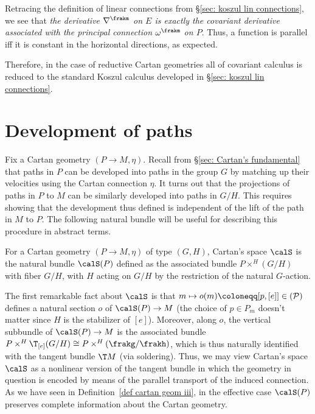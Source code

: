 Retracing the definition of linear connections from \S\ref{sec: koszul lin connections}, we see that \emph{the derivative $\nabla^\frakm$ on $E$ is exactly the covariant derivative associated with the principal connection $\omega^\frakm$ on $P$}.
Thus, a function is parallel iff it is constant in the horizontal directions, as expected. 

Therefore, in the case of reductive Cartan geometries all of covariant calculus is reduced to the standard Koszul calculus developed in \S\ref{sec: koszul lin connections}.










\section{Development of paths}

Fix a Cartan geometry $(P\to M,\eta)$. Recall from \S\ref{sec: Cartan's fundamental} that paths in $P$ can be developed into paths in the group $G$ by matching up their velocities using the Cartan connection $\eta$. It turns out that the projections of paths in $P$ to $M$ can be similarly developed into paths in $G\slash H$. This requires showing that the development thus defined is independent of the lift of the path in $M$ to $P$. The following natural bundle will be useful for describing this procedure in abstract terms.


\begin{defn}
    For a Cartan geometry $(P\to M,\eta)$ of type $(G,H)$, Cartan's space $\calS$ is the natural bundle $\calS(P)$ defined as the associated bundle $P\times^H (G\slash H)$ with fiber $G\slash H$, with $H$ acting on $G\slash H$ by the restriction of the natural $G$-action.
\end{defn}

The first remarkable fact about $\calS$ is that $m\mapsto o(m)\coloneqq [p,[e]]\in \cal(P)$ defines a natural section $o$ of $\calS(P)\to M$ (the choice of $p\in P_m$ doesn't matter since $H$ is the stabilizer of $[e]$). Moreover, along $o$, the vertical subbundle of $\calS(P)\to M$ is the associated bundle $P\times^H \T_{[e]}(G\slash H)\cong P\times^H (\frakg\slash\frakh)$, which is thus naturally identified with the tangent bundle $\T M$ (via soldering). Thus, we may view Cartan's space $\calS$ as a nonlinear version of the tangent bundle in which the geometry in question is encoded by means of the parallel transport of the induced connection. As we have seen in Definition~\ref{def cartan geom iii}, in the effective case $\calS(P)$ preserves complete information about the Cartan geometry.

